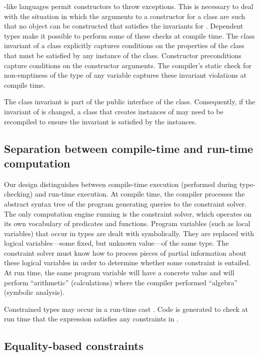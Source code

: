 \java{}-like languages permit constructors to throw exceptions. This
is necessary to deal with the situation in which the arguments to a
constructor for a class  are such that no object can be
constructed that satisfies the invariants for . Dependent
types make it possible to perform some of these checks at
compile time. The class invariant of a class explicitly captures
conditions on the properties of the class that must be satisfied by
any instance of the class.  Constructor preconditions capture
conditions on the constructor arguments.
The compiler's static check for
non-emptiness of the type of any variable captures these invariant
violations at compile time.

The class invariant is part of the public interface of the
class.  Consequently, if the invariant of  is changed, a class
that creates instances of 
may need to be recompiled to ensure the invariant is satisfied
by the instances.



\subsection{Separation between compile-time and run-time computation}

Our design distinguishes between compile-time execution (performed
during type-checking) and run-time execution. At compile time, the
compiler processes the abstract syntax tree of the program generating
queries to the constraint solver. The only computation engine running
is the constraint solver, which operates on its own vocabulary of
predicates and functions. Program variables (such as local variables)
that occur in types are dealt with symbolically. They are replaced
with logical variables---some fixed, but unknown value---of the same
type. The constraint solver must know how to process pieces of partial
information about these logical variables in order to determine
whether some constraint is entailed. At run time, the same program
variable will have a concrete value and will perform ``arithmetic''
(calculations) where the compiler performed ``algebra'' (symbolic
analysis).

Constrained types may occur in a run-time cast .  Code is
generated to check at run time that the expression 
satisfies any constraints in .

\subsection{Equality-based constraints}

